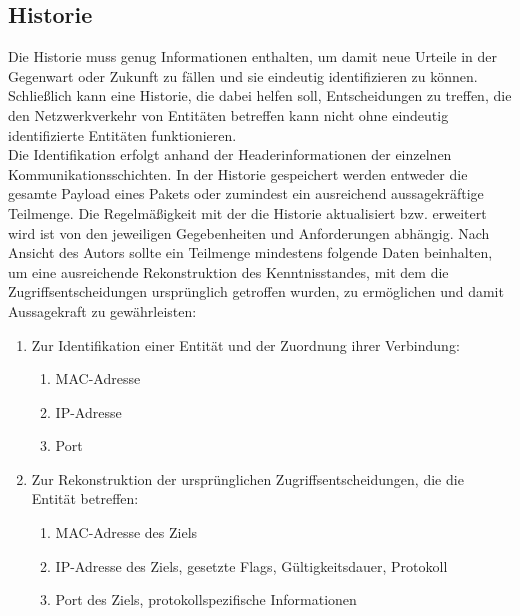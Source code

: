 \subsection{Historie}
Die Historie muss genug Informationen enthalten, um damit neue Urteile in der Gegenwart oder Zukunft zu fällen und sie eindeutig identifizieren zu können. Schließlich kann eine Historie, die dabei helfen soll, Entscheidungen zu treffen, die den Netzwerkverkehr von Entitäten betreffen kann nicht ohne eindeutig identifizierte Entitäten funktionieren.\\ Die Identifikation erfolgt anhand der Headerinformationen der einzelnen Kommunikationsschichten. In der Historie gespeichert werden entweder die gesamte Payload eines Pakets oder zumindest ein ausreichend aussagekräftige Teilmenge. Die Regelmäßigkeit mit der die Historie aktualisiert bzw. erweitert wird ist von den jeweiligen Gegebenheiten und Anforderungen abhängig. Nach Ansicht des Autors sollte ein Teilmenge mindestens folgende Daten beinhalten, um eine ausreichende Rekonstruktion des Kenntnisstandes, mit dem die Zugriffsentscheidungen ursprünglich getroffen wurden, zu ermöglichen und damit Aussagekraft zu gewährleisten:
\begin{enumerate}
\item{Zur Identifikation einer Entität und der Zuordnung ihrer Verbindung:}
\begin{enumerate}
\item{MAC-Adresse}
\item{IP-Adresse}
\item{Port}
\end{enumerate}
\item{Zur Rekonstruktion der ursprünglichen Zugriffsentscheidungen, die die Entität betreffen:}
\begin{enumerate}
\item{MAC-Adresse des Ziels}
\item{IP-Adresse des Ziels, gesetzte Flags, Gültigkeitsdauer, Protokoll}
\item{Port des Ziels, protokollspezifische Informationen}
\end{enumerate}

\end{enumerate}

